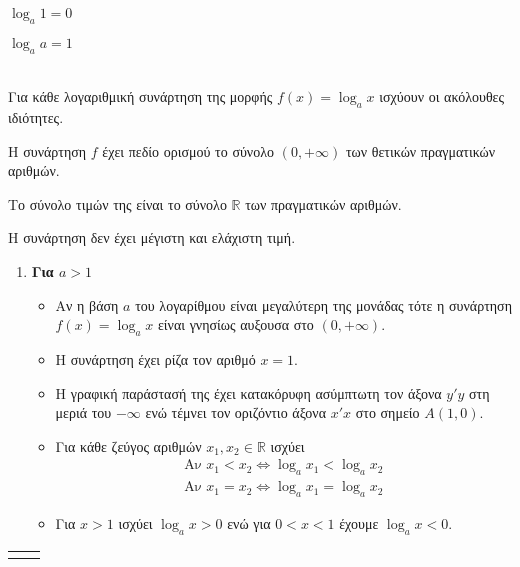 \documentclass[twoside,nofonts,internet,shmeiwseis]{thewria}
\begin{document}
\begin{multicols}{2}
\begin{rlist}
\item $ \log_{a}1=0 $
\item $ \log_{a}a=1 $
\end{rlist}
\end{multicols}\mbox{}\\
Για κάθε λογαριθμική συνάρτηση της μορφής $ f(x)=\log_{a}{x} $ ισχύουν οι ακόλουθες ιδιότητες.
\begin{rlist}
\item Η συνάρτηση $ f $ έχει πεδίο ορισμού το σύνολο $ (0,+\infty) $ των θετικών πραγματικών αριθμών.
\item Το σύνολο τιμών της είναι το σύνολο $ \mathbb{R} $ των πραγματικών αριθμών.
\item Η συνάρτηση δεν έχει μέγιστη και ελάχιστη τιμή.
\begin{enumerate}[itemsep=0mm,label=\bf\arabic*.,leftmargin=0cm]
\item \textbf{Για {\boldmath$ a>1 $}}
\begin{itemize}
\item Αν η βάση $ a $ του λογαρίθμου είναι μεγαλύτερη της μονάδας τότε η συνάρτηση $ f(x)=\log_{a}x $ είναι γνησίως αυξουσα στο $ (0,+\infty) $.
\item Η συνάρτηση έχει ρίζα τον αριθμό $ x=1 $.
\item Η γραφική παράστασή της έχει κατακόρυφη ασύμπτωτη τον άξονα $ y'y $ στη μεριά του $ -\infty $ ενώ τέμνει τον οριζόντιο άξονα $ x'x $ στο σημείο $ A(1,0) $.
\item Για κάθε ζεύγος αριθμών $ x_1,x_2\in\mathbb{R} $ ισχύει \begin{gather*}
\textrm{Αν }x_1<x_2\Leftrightarrow \log_{a}{x_1}<\log_{a}{x_2} \\
\textrm{Αν }x_1=x_2\Leftrightarrow \log_{a}{x_1}=\log_{a}{x_2}
\end{gather*}
\item Για $ x>1 $ ισχύει $ \log_{a}x>0 $ ενώ για $ 0<x<1 $ έχουμε $ \log_{a}x<0 $.
\end{itemize}
\end{enumerate}
\begin{center}
\begin{tabular}{p{6cm}p{6.2cm}}
\begin{tikzpicture}
\begin{axis}[x=.7cm,y=.7cm,aks_on,xmin=-.5,xmax=5,
ymin=-3,ymax=3.4,ticks=none,xlabel={\footnotesize $ x $},
ylabel={\footnotesize $ y $},belh ar]

\end{axis}
\end{tikzpicture}
\end{tabular}
\end{center}
\end{rlist}
\end{document}
